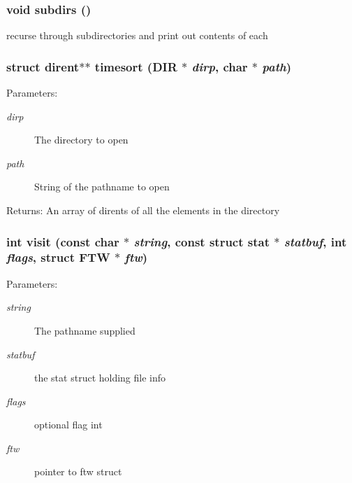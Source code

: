 \subsubsection{\setlength{\rightskip}{0pt plus 5cm}void subdirs ()}\label{dir_8c_10a72ffadf5d8b455877bf1757b31cfb}


recurse through subdirectories and print out contents of each 
\subsubsection{\setlength{\rightskip}{0pt plus 5cm}struct dirent$\ast$$\ast$ timesort (DIR $\ast$ {\em dirp}, char $\ast$ {\em path})}\label{dir_8c_a8c9478da23709170570587079d936d9}


\begin{Desc}
\item[Parameters:]
\begin{description}
\item[{\em dirp}]The directory to open \item[{\em path}]String of the pathname to open \end{description}
\end{Desc}
\begin{Desc}
\item[Returns:]An array of dirents of all the elements in the directory \end{Desc}
\subsubsection{\setlength{\rightskip}{0pt plus 5cm}int visit (const char $\ast$ {\em string}, const struct stat $\ast$ {\em statbuf}, int {\em flags}, struct FTW $\ast$ {\em ftw})}\label{dir_8c_c32b0ee96972472713ac1bd2d057cf61}


\begin{Desc}
\item[Parameters:]
\begin{description}
\item[{\em string}]The pathname supplied \item[{\em statbuf}]the stat struct holding file info \item[{\em flags}]optional flag int \item[{\em ftw}]pointer to ftw struct \end{description}
\end{Desc}

